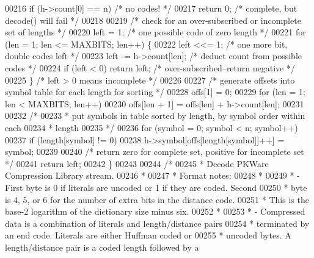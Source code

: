 \begin{DoxyCode}
00216     \textcolor{keywordflow}{if} (h->count[0] == n)               \textcolor{comment}{/* no codes! */}
00217         \textcolor{keywordflow}{return} 0;                       \textcolor{comment}{/* complete, but decode() will fail */}
00218 
00219     \textcolor{comment}{/* check for an over-subscribed or incomplete set of lengths */}
00220     left = 1;                           \textcolor{comment}{/* one possible code of zero length */}
00221     \textcolor{keywordflow}{for} (len = 1; len <= MAXBITS; len++) \{
00222         left <<= 1;                     \textcolor{comment}{/* one more bit, double codes left */}
00223         left -= h->count[len];          \textcolor{comment}{/* deduct count from possible codes */}
00224         \textcolor{keywordflow}{if} (left < 0) \textcolor{keywordflow}{return} left;      \textcolor{comment}{/* over-subscribed--return negative */}
00225     \}                                   \textcolor{comment}{/* left > 0 means incomplete */}
00226 
00227     \textcolor{comment}{/* generate offsets into symbol table for each length for sorting */}
00228     offs[1] = 0;
00229     \textcolor{keywordflow}{for} (len = 1; len < MAXBITS; len++)
00230         offs[len + 1] = offs[len] + h->count[len];
00231 
00232     \textcolor{comment}{/*}
00233 \textcolor{comment}{     * put symbols in table sorted by length, by symbol order within each}
00234 \textcolor{comment}{     * length}
00235 \textcolor{comment}{     */}
00236     for (symbol = 0; symbol < n; symbol++)
00237         \textcolor{keywordflow}{if} (length[symbol] != 0)
00238             h->symbol[offs[length[symbol]]++] = symbol;
00239 
00240     \textcolor{comment}{/* return zero for complete set, positive for incomplete set */}
00241     \textcolor{keywordflow}{return} left;
00242 \}
00243 
00244 \textcolor{comment}{/*}
00245 \textcolor{comment}{ * Decode PKWare Compression Library stream.}
00246 \textcolor{comment}{ *}
00247 \textcolor{comment}{ * Format notes:}
00248 \textcolor{comment}{ *}
00249 \textcolor{comment}{ * - First byte is 0 if literals are uncoded or 1 if they are coded.  Second}
00250 \textcolor{comment}{ *   byte is 4, 5, or 6 for the number of extra bits in the distance code.}
00251 \textcolor{comment}{ *   This is the base-2 logarithm of the dictionary size minus six.}
00252 \textcolor{comment}{ *}
00253 \textcolor{comment}{ * - Compressed data is a combination of literals and length/distance pairs}
00254 \textcolor{comment}{ *   terminated by an end code.  Literals are either Huffman coded or}
00255 \textcolor{comment}{ *   uncoded bytes.  A length/distance pair is a coded length followed by a}

\end{DoxyCode}
